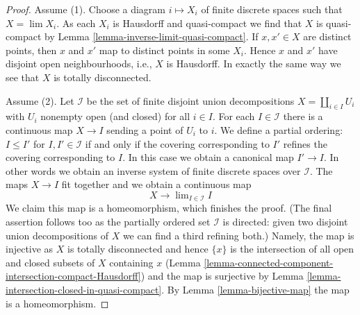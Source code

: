 \documentclass[10pt,a4paper]{amsart}
\theoremstyle{plain}
\theoremstyle{definition}
\theoremstyle{remark}
\numberwithin{equation}{subsection}
\def\lim{\mathop{\mathrm{lim}}\nolimits}
\begin{document}
\begin{proof}
Assume (1). Choose a diagram $i \mapsto X_i$ of finite discrete spaces
such that $X = \lim X_i$. As each $X_i$ is Hausdorff and quasi-compact we find
that $X$ is quasi-compact by Lemma \ref{lemma-inverse-limit-quasi-compact}.
If $x, x' \in X$ are distinct points, then $x$ and $x'$ map to
distinct points in some $X_i$. Hence $x$ and $x'$ have disjoint
open neighbourhoods, i.e., $X$ is Hausdorff. In exactly the same way
we see that $X$ is totally disconnected.

\medskip\noindent
Assume (2). Let $\mathcal{I}$ be the set of finite disjoint union
decompositions $X = \coprod_{i \in I} U_i$ with $U_i$ nonempty open
(and closed) for all $i \in I$.
For each $I \in \mathcal{I}$ there is a continuous map
$X \to I$ sending a point of $U_i$ to $i$. We define a partial
ordering: $I \leq I'$ for $I, I' \in \mathcal{I}$ if and only
if the covering corresponding to $I'$ refines the covering corresponding
to $I$. In this case we obtain a canonical map $I' \to I$. In other
words we obtain an inverse system of finite discrete spaces over $\mathcal{I}$.
The maps $X \to I$ fit together and we obtain a continuous map
$$
X \longrightarrow \lim_{I \in \mathcal{I}} I
$$
We claim this map is a homeomorphism, which finishes the proof.
(The final assertion follows too as the partially ordered set
$\mathcal{I}$ is directed: given two disjoint union decompositions
of $X$ we can find a third refining both.)
Namely, the map is injective as $X$ is totally disconnected
and hence $\{x\}$ is the intersection of all open and closed subsets
of $X$ containing $x$
(Lemma \ref{lemma-connected-component-intersection-compact-Hausdorff})
and  the map is surjective by
Lemma \ref{lemma-intersection-closed-in-quasi-compact}.
By Lemma \ref{lemma-bijective-map} the map is a homeomorphism.
\end{proof}
\end{document}
